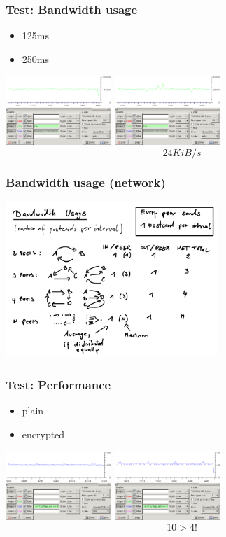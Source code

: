 \documentclass{beamer}
\begin{document}
\frame
{
  \frametitle{Test: Bandwidth usage}
  \begin{itemize}
          \item 125ms
          \item 250ms
   \end{itemize}
  \begin{center}
   \includegraphics[width=4cm]{../bandwidth-0125.png}
   \includegraphics[width=4cm]{../bandwidth-0250.png}
   $$24 KiB/s$$
  \end{center}
}

\frame
{
  \frametitle{Bandwidth usage (network)}
  \begin{center}
   \includegraphics[width=8cm]{../bandwidth.png}
  \end{center}
}

\frame
{
  \frametitle{Test: Performance}
  \begin{itemize}
          \item plain
          \item encrypted
   \end{itemize}
  \begin{center}
   \includegraphics[width=4cm]{../noise-plain-no-limit.png}
   \includegraphics[width=4cm]{../noise-no-limit.png}
   $$10 > 4!$$
  \end{center}
}
\end{document}
